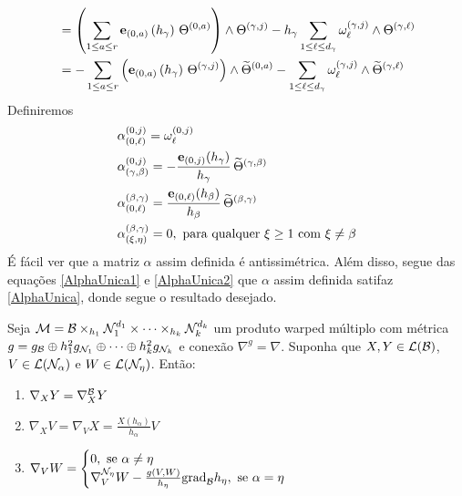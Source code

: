 \begin{demm}
\begin{equation}
\begin{aligned}
&= \left( \sum_{1 \leq a \leq r} \mathbf{e}_{(0, a)}\left( h_{\gamma} \right) \, \Theta^{(0, a)} \right) \wedge \Theta^{(\gamma, j)} - h_{\gamma} \sum_{1 \leq \ell \leq d_{\gamma}} \omega^{(\gamma, j)}_{\ell} \wedge \Theta^{(\gamma, \ell)} \\
&= -\sum_{1 \leq a \leq r}  \left( \mathbf{e}_{(0, a)}\left( h_{\gamma} \right) \, \Theta^{(\gamma, j)}  \right) \wedge  \widetilde{\Theta}^{(0, a)} - \sum_{1 \leq \ell \leq d_{\gamma}} \omega^{(\gamma, j)}_{\ell} \wedge \widetilde{\Theta}^{(\gamma, \ell)}  
\end{aligned}
\end{equation}
Definiremos
\begin{align*}
&\alpha^{(0, j)}_{(0, \ell)} = \omega^{(0, j)}_{\ell} \\
&\alpha^{(0, j)}_{(\gamma, \beta)} = -\frac{ \mathbf{e}_{(0, j)}(h_{\gamma})}{h_{\gamma}} \, \widetilde{\Theta}^{(\gamma, \beta)} \\
&\alpha^{(\beta, \gamma)}_{(0, \ell)} = \frac{\mathbf{e}_{(0, \ell)} (h_{\beta})}{h_{\beta}} \, \widetilde{\Theta}^{(\beta, \gamma)} \\
&\alpha^{(\beta, \gamma)}_{(\xi, \eta)} = 0, \text{ para qualquer $\xi \geq 1$ com $\xi \neq \beta$}
\end{align*}
É fácil ver que a matriz $\alpha$ assim definida é antissimétrica. Além disso, segue das equações \cref{AlphaUnica1} e \cref{AlphaUnica2} que $\alpha$ assim definida satifaz \cref{AlphaUnica}, donde segue o resultado desejado. 
\end{demm}
\begin{lema}\label{ConexaoDoWarped}
Seja $\mathcal{M} = \mathcal{B} \times_{h_1} \mathcal{N}_1^{d_1} \times \cdots \times_{h_k} \mathcal{N}_{k}^{d_k}$ um produto warped múltiplo com métrica $g = g_{\mathcal{B}} \oplus h_1^2 g_{\mathcal{N}_1} \oplus \cdots \oplus h_{k}^2 g_{\mathcal{N}_k}$ e conexão $\nabla^g = \nabla$. Suponha que $X, Y \in \mathcal{L}(\mathcal{B})$, $ V \in \mathcal{L}(\mathcal{N}_{\alpha})$ e $W \in \mathcal{L}(\mathcal{N}_{\eta})$. Então:
\begin{enumerate}[label=\color{blue}\normalfont\textbf{(\theenumi)}]
\item\label{nablaXYWarp} $\nabla_X Y = \nabla^{\mathcal{B}}_X Y$
\item\label{NablaWarp} $\nabla_X V = \nabla_V X = \frac{X(h_{\alpha})}{h_{\alpha}} V$
\item\label{NablaVWdoWarp} $\nabla_V W = \begin{cases} 0, \text{ se } \alpha \neq \eta \\ \nabla^{\mathcal{N}_{\eta}}_V W - \frac{g(V, W)}{h_{\eta}} \text{grad}_{\mathcal{B}} h_{\eta}, \text{ se } \alpha = \eta \end{cases}$
\end{enumerate}
\end{lema}
